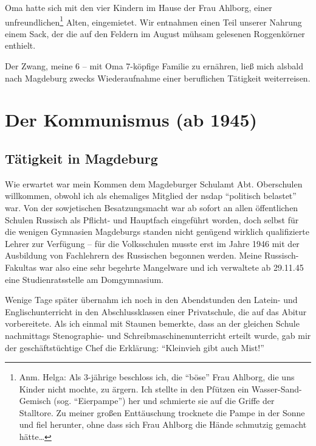 \documentclass[a5paper,pagesize,10pt,twoside=true]{scrbook}
\renewcommand{\marginpar}[2][]{}
\begin{document}
Oma hatte sich mit den vier Kindern im Hause der Frau Ahlborg, einer unfreundlichen\footnote{Anm. Helga: Als 3-jährige beschloss ich, die \enquote{böse} Frau Ahlborg, die uns Kinder nicht mochte, zu ärgern. Ich stellte in den Pfützen ein Wasser-Sand-Gemisch (sog. \enquote{Eierpampe}) her und schmierte sie auf die Griffe der Stalltore. Zu meiner großen Enttäuschung trocknete die Pampe in der Sonne und fiel herunter, ohne dass sich Frau Ahlborg die Hände schmutzig gemacht hätte\dots} Alten, eingemietet. Wir entnahmen einen Teil unserer Nahrung einem Sack, der die auf den Feldern im August mühsam gelesenen Roggenkörner enthielt.

\marginpar{123} Der Zwang, meine 6 -- mit Oma 7-köpfige Familie zu ernähren, ließ mich alsbald nach Magdeburg zwecks Wiederaufnahme einer beruflichen Tätigkeit weiterreisen.

\chapter{Der Kommunismus (ab 1945)}
\section{Tätigkeit in Magdeburg}

Wie erwartet war mein Kommen dem Magdeburger Schulamt Abt. Oberschulen willkommen, obwohl ich als ehemaliges Mitglied der \ac{nsdap} \enquote{politisch belastet} war. Von der sowjetischen Besatzungsmacht war ab sofort an allen öffentlichen Schulen Russisch als Pflicht- und Hauptfach eingeführt worden, doch selbst für die wenigen Gymnasien Magdeburgs standen nicht genügend wirklich qualifizierte Lehrer zur Verfügung -- für die Volksschulen musste erst im Jahre 1946 mit der Ausbildung von Fachlehrern des Russischen begonnen werden. Meine Russisch-Fakultas war also eine sehr begehrte Mangelware und ich verwaltete ab 29.11.45 eine Studienratsstelle am Domgymnasium.

Wenige Tage später übernahm ich noch in den Abendstunden den Latein- und Englischunterricht in den Abschlussklassen einer Privatschule, die auf das Abitur vorbereitete. Als ich einmal mit Staunen bemerkte, dass an der gleichen Schule nachmittags Stenographie- und Schreibmaschinenunterricht erteilt wurde, gab mir der geschäftstüchtige Chef die Erklärung: \enquote{Kleinvieh gibt auch Mist!}
\end{document}
